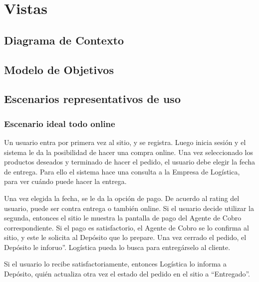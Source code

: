 
\section{Vistas}
\fixme

\newpage

  \subsection{Diagrama de Contexto}
  \fixme

  \newpage


  \subsection{Modelo de Objetivos}
  \fixme
  
  \newpage
  
  \subsection{Escenarios representativos de uso}
  
    \subsubsection{Escenario ideal todo online} 

    Un usuario entra por primera vez al sitio, y se registra. Luego inicia sesión y el sistema le da la posibilidad de hacer una compra online. Una vez seleccionado los productos deseados y terminado de hacer el pedido, el usuario debe elegir la fecha de entrega. Para ello el sistema hace una consulta a la Empresa de Logística, para ver cuándo puede hacer la entrega. 
    
    Una vez elegida la fecha, se le da la opción de pago. De acuerdo al rating del usuario, puede ser contra entrega o también online. Si el usuario decide utilizar la segunda, entonces el sitio le muestra la pantalla de pago del Agente de Cobro correspondiente. Si el pago es satisfactorio, el Agente de Cobro se lo confirma al sitio, y este le solicita al Depósito que lo prepare. Una vez cerrado el pedido, el Depósito le inforuo”. Logística pueda lo busca para entregárselo al cliente. 
    
    Si el usuario lo recibe satisfactoriamente, entonces Logística lo informa a Depósito, quién actualiza otra vez el estado del pedido en el sitio a “Entregado”. 
    
  \fixme